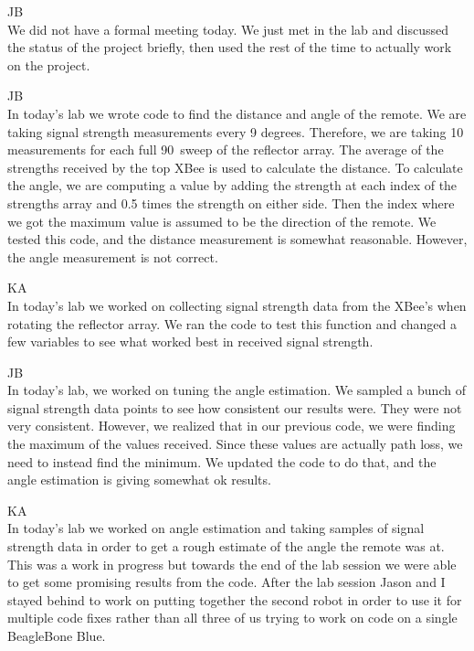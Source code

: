 \documentclass[fontsize=11pt, %
                             paper=letter, %
                             openany, %
                             captions=tableheading,
                             index=totoc,
                             hyperref]{labbook}
\begin{document}
\begin{addmargin}[0cm]{0cm}
JB\\
We did not have a formal meeting today. We just met in the lab and discussed the status of the project briefly, then used the rest of the time to actually work on the project.

JB\\
In today's lab we wrote code to find the distance and angle of the remote. We are taking signal strength measurements every 9 degrees. Therefore, we are taking 10 measurements for each full 90\textdegree~sweep of the reflector array. The average of the strengths received by the top XBee is used to calculate the distance. To calculate the angle, we are computing a value by adding the strength at each index of the strengths array and 0.5 times the strength on either side. Then the index where we got the maximum value is assumed to be the direction of the remote. We tested this code, and the distance measurement is somewhat reasonable. However, the angle measurement is not correct.

\vspace*{12pt}
KA\\
In today's lab we worked on collecting signal strength data from the XBee's when rotating the reflector array. We ran the code to test this function and changed a few variables to see what worked best in received signal strength.

JB\\
In today's lab, we worked on tuning the angle estimation. We sampled a bunch of signal strength data points to see how consistent our results were. They were not very consistent. However, we realized that in our previous code, we were finding the maximum of the values received. Since these values are actually path loss, we need to instead find the minimum. We updated the code to do that, and the angle estimation is giving somewhat ok results.

\vspace*{12pt}
KA\\
In today's lab we worked on angle estimation and taking samples of signal strength data in order to get a rough estimate of the angle the remote was at. This was a work in progress but towards the end of the lab session we were able to get some promising results from the code. After the lab session Jason and I stayed behind to work on putting together the second robot in order to use it for multiple code fixes rather than all three of us trying to work on code on a single BeagleBone Blue.


\end{addmargin}
\end{document}
